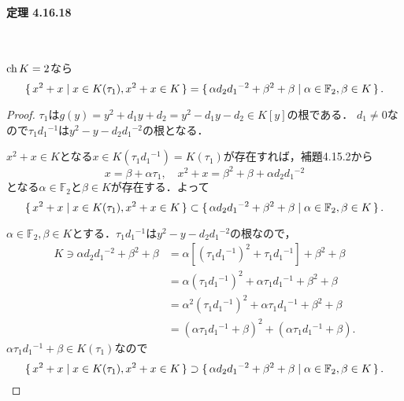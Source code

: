 \documentclass[a4paper]{ltjsreport}
\begin{document}
\paragraph{定理 4.16.18}~
\begin{screen}
  \(\operatorname{ch} K = 2\)なら
  \[ \set{x^2+x | x \in K(\tau_1) , x^2+x \in K} = \set{\alpha d_2 d_1{}^{-2} + \beta^2 + \beta | \alpha \in \mathbb{F}_2 , \beta \in K} . \]
\end{screen}
\begin{proof}
  \(\tau_1\)は\(g(y) = y^2 + d_1 y + d_2 = y^2 - d_1 y - d_2 \in K[y]\)の根である．
  \(d_1 \neq 0\)なので\(\tau_1d_1{}^{-1}\)は\(y^2-y-d_2d_1{}^{-2}\)の根となる．

  \(x^2+x \in K\)となる\(x \in K(\tau_1d_1{}^{-1}) = K(\tau_1)\)が存在すれば，補題4.15.2から
  \[ x=\beta+\alpha \tau_1 , \quad x^2+x = \beta^2 + \beta + \alpha d_2d_1{}^{-2} \]
  となる\(\alpha\in\mathbb{F}_2\)と\(\beta\in K\)が存在する．よって
  \[ \set{x^2+x | x \in K(\tau_1) , x^2+x \in K} \subset \set{\alpha d_2 d_1{}^{-2} + \beta^2 + \beta | \alpha \in \mathbb{F}_2 , \beta \in K} . \]

  \(\alpha \in \mathbb{F}_2 , \beta \in K\)とする．\(\tau_1d_1{}^{-1}\)は\(y^2-y-d_2d_1{}^{-2}\)の根なので，
  \begin{align*}
    K \ni \alpha d_2 d_1{}^{-2} + \beta^2 + \beta
    &= \alpha \left[ (\tau_1d_1{}^{-1})^2 + \tau_1d_1{}^{-1} \right] + \beta^2 + \beta \\
    &= \alpha (\tau_1d_1{}^{-1})^2 + \alpha \tau_1d_1{}^{-1} + \beta^2 + \beta \\
    &= \alpha^2 (\tau_1d_1{}^{-1})^2 + \alpha \tau_1d_1{}^{-1} + \beta^2 + \beta \\
    &= ( \alpha \tau_1d_1{}^{-1} + \beta)^2 + (\alpha \tau_1d_1{}^{-1} + \beta) .
  \end{align*}
  \( \alpha \tau_1d_1{}^{-1} + \beta \in K(\tau_1)\)なので
  \[ \set{x^2+x | x \in K(\tau_1) , x^2+x \in K} \supset \set{\alpha d_2 d_1{}^{-2} + \beta^2 + \beta | \alpha \in \mathbb{F}_2 , \beta \in K} . \]
\end{proof}
\end{document}
